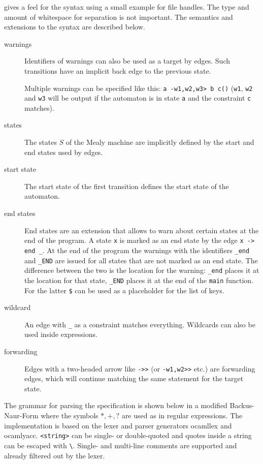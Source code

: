  gives a feel for the syntax using a small example for file handles. The type and amount of whitespace for separation is not important.
The semantics and extensions to the syntax are described below.
\begin{description}
\item[warnings]
Identifiers of warnings can also be used as a target by edges. Such transitions have an implicit back edge to the previous state.

Multiple warnings can be specified like this: \verb|a -w1,w2,w3> b c()| (\verb|w1|, \verb|w2| and \verb|w3| will be output if the automaton is in state \verb|a| and the constraint \verb|c| matches).

\item[states]
The states $S$ of the Mealy machine are implicitly defined by the start and end states used by edges.

\item[start state]
The start state of the first transition defines the start state of the automaton.

\item[end states]
End states are an extension that allows to warn about certain states at the end of the program. A state \verb|x| is marked as an end state by the edge \verb|x -> end _|.
At the end of the program the warnings with the identifiers \verb|_end| and \verb|_END| are issued for all states that are not marked as an end state. The difference between the two is the location for the warning: \verb|_end| places it at the location for that state, \verb|_END| places it at the end of the \verb|main| function. For the latter \verb|$| can be used as a placeholder for the list of keys.

\item[wildcard]
An edge with \verb|_| as a constraint matches everything. Wildcards can also be used inside expressions.

\item[forwarding]
Edges with a two-headed arrow like \verb|->>| (or \verb|-w1,w2>>| etc.) are forwarding edges, which will continue matching the same statement for the target state.\\
\end{description}
The grammar for parsing the specification is shown below in a modified Backus-Naur-Form where the symbols $*, +, ?$ are used as in regular expressions. The implementation is based on the lexer and parser generators ocamllex and ocamlyacc. \verb|<string>| can be single- or double-quoted and quotes inside a string can be escaped with \verb|\|. Single- and multi-line comments are supported and already filtered out by the lexer.
